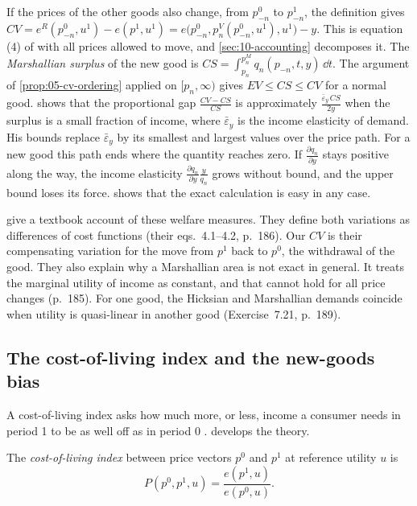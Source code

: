 \begin{remark}\label{rem:10-willig}
If the prices of the other goods also change, from $p_{-n}^0$ to $p_{-n}^1$, the definition gives
$CV = e^R(p_{-n}^0,u^1) - e(p^1,u^1) = e\bigl(p_{-n}^0,p_n^V(p_{-n}^0,u^1),u^1\bigr) - y$. This is equation
(4) of \citet{Hausman1997} with all prices allowed to move, and \cref{sec:10-accounting} decomposes it. The
\emph{Marshallian surplus} of the new good is $CS = \int_{p_n}^{p_n^M}q_n(p_{-n},t,y)\,\dd t$. The argument
of \cref{prop:05-cv-ordering} applied on $[p_n,\infty)$ gives $EV \le CS \le CV$ for a normal good.
\citet{Willig1976} shows that the proportional gap $\frac{CV - CS}{CS}$ is approximately
$\frac{\bar\varepsilon_y\, CS}{2y}$ when the surplus is a small fraction of income, where $\bar\varepsilon_y$ is
the income elasticity of demand. His bounds replace $\bar\varepsilon_y$ by its smallest and largest values over the
price path. For a new good this path ends where the quantity reaches zero. If $\frac{\partial q_n}{\partial y}$
stays positive along the way, the income elasticity $\frac{\partial q_n}{\partial y}\frac{y}{q_n}$ grows without
bound, and the upper bound loses its force.  shows that the exact calculation is
easy in any case.

\citet[Section~7.4, pp.~184--188]{DeatonMuellbauer1980b} give a textbook account of these welfare measures. They
define both variations as differences of cost functions (their eqs.~4.1--4.2, p.~186). Our $CV$ is their
compensating variation for the move from $p^1$ back to $p^0$, the withdrawal of the good. They also explain why a
Marshallian area is not exact in general. It treats the marginal utility of income as constant, and that cannot
hold for all price changes (p.~185). For one good, the Hicksian and Marshallian demands coincide when utility is
quasi-linear in another good (Exercise~7.21, p.~189).
\end{remark}

\subsection{The cost-of-living index and the new-goods bias}\label{sec:10-col}

A cost-of-living index asks how much more, or less, income a consumer needs in period 1 to be as well off as
in period 0 \citep[p.~209]{Hausman1997}. \citet{Pollak1989} develops the theory.

\begin{definition}\label{def:10-konus}
The \emph{cost-of-living index} between price vectors $p^0$ and $p^1$ at reference utility $u$ is
\begin{equation}\label{eq:10-konus}
  P(p^0,p^1,u) = \frac{e(p^1,u)}{e(p^0,u)}.
\end{equation}
\end{definition}

